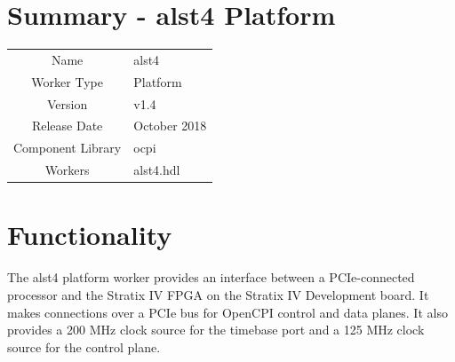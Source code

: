 \documentclass{article}
\author{} %
\date{Version \docVersion} %
\title{\docTitle}
\def\docVersion{1.4}
\def\comp{alst4}
\def\Comp{alst4 Platform}
\begin{document}
\section*{Summary - \Comp}
\begin{tabular}{|c|M{13.5cm}|}
	\hline
	                  &                                                    \\
	\hline
	Name              & \comp                                              \\
	\hline
	Worker Type       & Platform                                           \\
	\hline
	Version           & v\docVersion \\
	\hline
	Release Date      & October 2018 \\
	\hline
	Component Library & ocpi                                        \\
	\hline
	Workers & \comp.hdl                                        \\
	\hline
\end{tabular}

\section*{Functionality}
\begin{flushleft}
The alst4 platform worker provides an interface between a PCIe-connected processor and the Stratix IV FPGA on the Stratix IV Development board. It makes connections over a PCIe bus for OpenCPI control and data planes. It also provides a 200 MHz clock source for the timebase port and a 125 MHz clock source for the control plane.
\end{flushleft}
\end{document}

